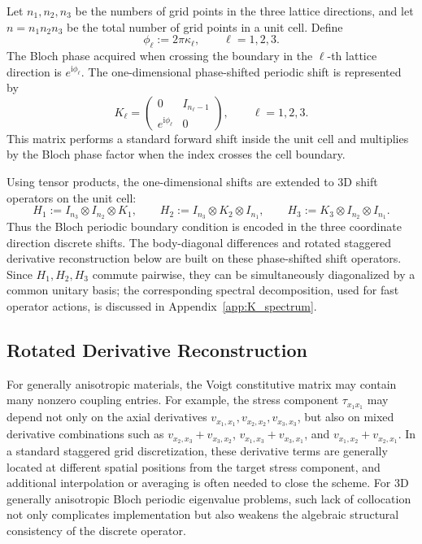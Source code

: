\documentclass[11pt,oneside]{article}
\numberwithin{equation}{section}
\theoremstyle{plain}
\theoremstyle{remark}
\begin{document}
Let \(n_1,n_2,n_3\) be the numbers of grid points in the three lattice directions, and let \(n=n_1n_2n_3\) be the total number of grid points in a unit cell. Define
\begin{equation}\label{eq:phi_def_main}
\phi_\ell:=2\pi\kappa_\ell,\qquad \ell=1,2,3.
\end{equation}
The Bloch phase acquired when crossing the boundary in the \(\ell\)-th lattice direction is \(e^{\mathrm i\phi_\ell}\). The one-dimensional phase-shifted periodic shift is represented by
\begin{equation}\label{eq:K_def_main}
K_\ell=
\begin{pmatrix}
0 & I_{n_\ell-1}\\
e^{\mathrm i\phi_\ell} & 0
\end{pmatrix},
\qquad \ell=1,2,3.
\end{equation}
This matrix performs a standard forward shift inside the unit cell and multiplies by the Bloch phase factor when the index crosses the cell boundary.

Using tensor products, the one-dimensional shifts are extended to 3D shift operators on the unit cell:
\begin{equation}\label{eq:H_def_main}
H_1:=I_{n_3}\otimes I_{n_2}\otimes K_1,\qquad
H_2:=I_{n_3}\otimes K_2\otimes I_{n_1},\qquad
H_3:=K_3\otimes I_{n_2}\otimes I_{n_1}.
\end{equation}
Thus the Bloch periodic boundary condition is encoded in the three coordinate direction discrete shifts. The body-diagonal differences and rotated staggered derivative reconstruction below are built on these phase-shifted shift operators. Since \(H_1,H_2,H_3\) commute pairwise, they can be simultaneously diagonalized by a common unitary basis; the corresponding spectral decomposition, used for fast operator actions, is discussed in Appendix~\ref{app:K_spectrum}.

\subsection{Rotated Derivative Reconstruction}

For generally anisotropic materials, the Voigt constitutive matrix may contain many nonzero coupling entries. For example, the stress component \(\tau_{x_1x_1}\) may depend not only on the axial derivatives \(v_{x_1,x_1},v_{x_2,x_2},v_{x_3,x_3}\), but also on mixed derivative combinations such as \(v_{x_2,x_3}+v_{x_3,x_2}\), \(v_{x_1,x_3}+v_{x_3,x_1}\), and \(v_{x_1,x_2}+v_{x_2,x_1}\). In a standard staggered grid discretization, these derivative terms are generally located at different spatial positions from the target stress component, and additional interpolation or averaging is often needed to close the scheme. For 3D generally anisotropic Bloch periodic eigenvalue problems, such lack of collocation not only complicates implementation but also weakens the algebraic structural consistency of the discrete operator.
\end{document}
